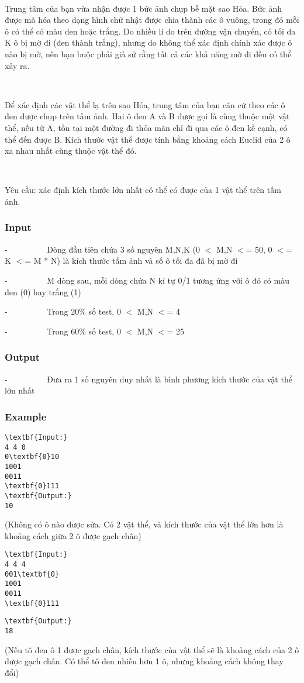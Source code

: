 

 

Trung tâm của bạn vừa nhận được 1 bức ảnh chụp bề mặt sao Hỏa. Bức ảnh được mã hóa theo dạng hình chữ nhật được chia thành các ô vuông, trong đó mỗi ô có thể có màu đen hoặc trắng. Do nhiều lí do trên đường vận chuyển, có tối đa K ô bị mờ đi (đen thành trắng), nhưng do không thể xác định chính xác được ô nào bị mờ, nên bạn buộc phải giả sử rằng tất cả các khả năng mờ đi đều có thể xảy ra.

 

Để xác định các vật thể lạ trên sao Hỏa, trung tâm của bạn căn cứ theo các ô đen được chụp trên tấm ảnh. Hai ô đen A và B được gọi là cùng thuộc một vật thể, nếu từ A, tồn tại một đường đi thỏa mãn chỉ đi qua các ô đen kề cạnh, có thể đến được B. Kích thước vật thể được tính bằng khoảng cách Euclid của 2 ô xa nhau nhất cùng thuộc vật thể đó.

 

Yêu cầu: xác định kích thước lớn nhất có thể có được của 1 vật thể trên tấm ảnh.

\subsubsection{Input}

-          Dòng đầu tiên chứa 3 số nguyên M,N,K (0 $<$ M,N $<$= 50, 0 $<$= K $<$= M * N) là kích thước tấm ảnh và số ô tối đa đã bị mờ đi

-          M dòng sau, mỗi dòng chứa N kí tự 0/1 tương ứng với ô đó có màu đen (0) hay trắng (1)

-          Trong 20\% số test, 0 $<$ M,N $<$= 4

-          Trong 60\% số test, 0 $<$ M,N $<$= 25

\subsubsection{Output}

-          Đưa ra 1 số nguyên duy nhất là bình phương kích thước của vật thể lớn nhất

\subsubsection{Example}
\begin{verbatim}
\textbf{Input:}
4 4 0
0\textbf{0}10
1001
0011
\textbf{0}111
\textbf{Output:}
10\end{verbatim}

(Không có ô nào được sửa. Có 2 vật thể, và kích thước của vật thể lớn hơn là khoảng cách giữa 2 ô được gạch chân)
\begin{verbatim}
\textbf{Input:}
4 4 4
001\textbf{0}
1001
0011
\textbf{0}111\end{verbatim}
\begin{verbatim}
\textbf{Output:}
18\end{verbatim}

(Nếu tô đen ô 1 được gạch chân, kích thước của vật thể sẽ là khoảng cách của 2 ô được gạch chân. Có thể tô đen nhiều hơn 1 ô, nhưng khoảng cách không thay đổi)